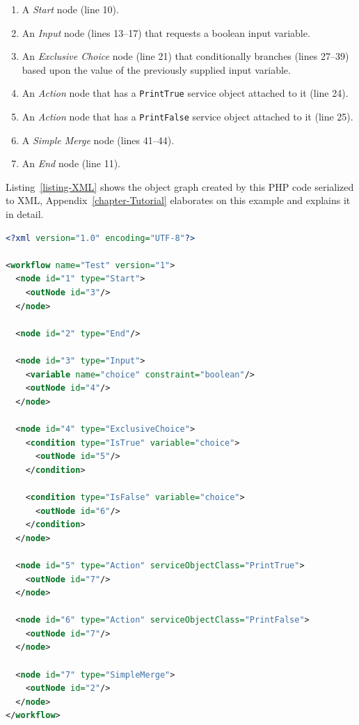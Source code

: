 \begin{enumerate}
\item A \emph{Start} node (line 10).
\item An \emph{Input} node (lines 13--17) that requests a boolean input
      variable.
\item An \emph{Exclusive Choice} node (line 21) that conditionally
      branches (lines 27--39) based upon the value of the previously
      supplied input variable.
\item An \emph{Action} node that has a \texttt{PrintTrue} service
      object attached to it (line 24).
\item An \emph{Action} node that has a \texttt{PrintFalse} service
      object attached to it (line 25).
\item A \emph{Simple Merge} node (lines 41--44).
\item An \emph{End} node (line 11).
\end{enumerate}

Listing~\ref{listing-XML} shows the object graph created by this PHP code
serialized to XML, Appendix~\ref{chapter-Tutorial} elaborates on this example
and explains it in detail.

\begin{lstlisting}[language=XML,firstnumber=1,stepnumber=100,float,caption={Workflow specification in XML markup},label=listing-XML]
<?xml version="1.0" encoding="UTF-8"?>

<workflow name="Test" version="1">
  <node id="1" type="Start">
    <outNode id="3"/>
  </node>

  <node id="2" type="End"/>

  <node id="3" type="Input">
    <variable name="choice" constraint="boolean"/>
    <outNode id="4"/>
  </node>

  <node id="4" type="ExclusiveChoice">
    <condition type="IsTrue" variable="choice">
      <outNode id="5"/>
    </condition>

    <condition type="IsFalse" variable="choice">
      <outNode id="6"/>
    </condition>
  </node>

  <node id="5" type="Action" serviceObjectClass="PrintTrue">
    <outNode id="7"/>
  </node>

  <node id="6" type="Action" serviceObjectClass="PrintFalse">
    <outNode id="7"/>
  </node>

  <node id="7" type="SimpleMerge">
    <outNode id="2"/>
  </node>
</workflow>
\end{lstlisting}

